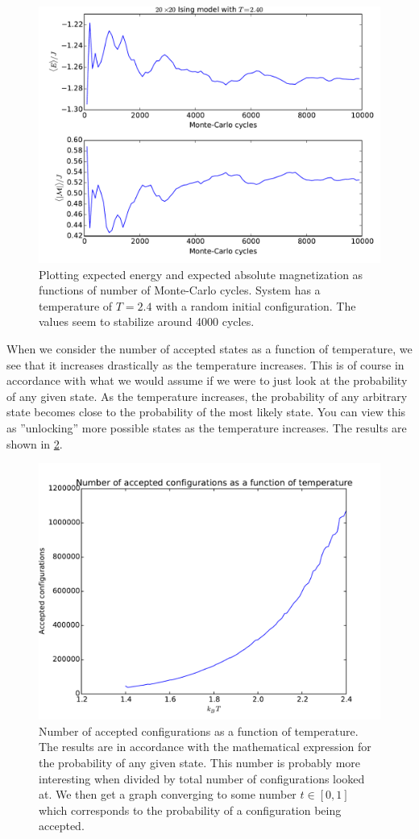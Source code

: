 \begin{figure}
  \centering
  \includegraphics[width=0.8\linewidth]{2-4_mc_random.pdf}
  \caption{Plotting expected energy and expected absolute magnetization as
  functions of number of Monte-Carlo cycles. System has a temperature of $T =
2.4$ with a random initial configuration. The values seem to stabilize around
4000 cycles.}
  \label{fig:2_mc_random}
\end{figure}

When we consider the number of accepted states as a function of temperature, we
see that it increases drastically as the temperature increases. This is of
course in accordance with what we would assume if we were to just look at the
probability of any given state. As the temperature increases, the probability
of any arbitrary state becomes close to the probability of the most likely
state. You can view this as ''unlocking'' more possible states as the
temperature increases. The results are shown in \cref{fig:accepted_configs}.
\begin{figure}
  \centering
  \includegraphics[width=0.8\linewidth]{accepted_configs.pdf}
  \caption{Number of accepted configurations as a function of temperature. The
  results are in accordance with the mathematical expression for the
probability of any given state. This number is probably more interesting when
divided by total number of configurations looked at. We then get a graph
converging to some number $t \in \left[ 0, 1 \right]$ which corresponds to the
probability of a configuration being accepted.}
  \label{fig:accepted_configs}
\end{figure}

